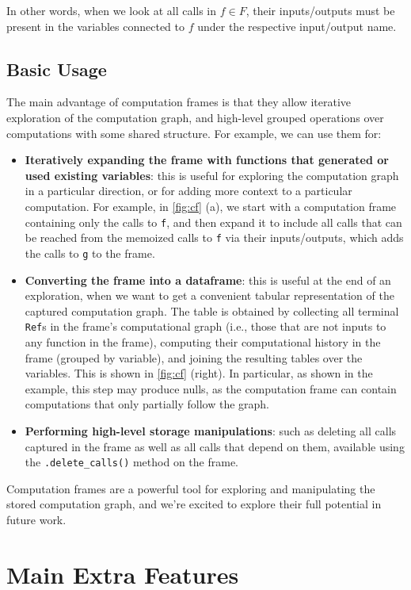 In other words, when we look at all calls in $f\in F$, their inputs/outputs must
be present in the variables connected to $f$ under the respective input/output
name.

\subsection{Basic Usage}
\label{subsection:cf-basic-usage}

The main advantage of computation frames is that they allow iterative
exploration of the computation graph, and high-level grouped operations over
computations with some shared structure. For example, we can use them for:
\begin{itemize}
\item \textbf{Iteratively expanding the frame with functions that generated or
used existing variables}: this is useful for exploring the computation graph in
a particular direction, or for adding more context to a particular computation.
For example, in \autoref{fig:cf} (a), we start with a computation frame
containing only the calls to \texttt{f}, and then expand it to include all calls
that can be reached from the memoized calls to \texttt{f} via their
inputs/outputs, which adds the calls to \texttt{g} to the frame.
\item \textbf{Converting the frame into a dataframe}: this is useful at the end
of an exploration, when we want to get a convenient tabular representation of
the captured computation graph. The table is obtained by collecting all terminal
\texttt{Ref}s in the frame's computational graph (i.e., those that are not
inputs to any function in the frame), computing their computational history in
the frame (grouped by variable), and joining the resulting tables over the
variables. This is shown in \autoref{fig:cf} (right). In particular, as shown
in the example, this step may produce nulls, as the computation frame can
contain computations that only partially follow the graph.
\item \textbf{Performing high-level storage manipulations}: such as deleting all
calls captured in the frame as well as all calls that depend on them, available
using the \verb|.delete_calls()| method on the frame.
\end{itemize}

Computation frames are a powerful tool for exploring and manipulating the stored
computation graph, and we're excited to explore their full potential in future
work.

\section{Main Extra Features}
\label{section:extra-features}

